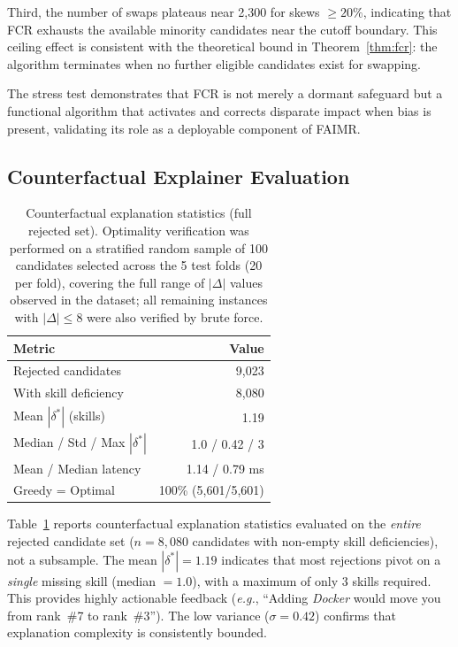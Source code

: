 \documentclass{svproc}
\begin{document}
Third, the number of swaps plateaus near 2,300 for skews $\geq 20\%$, indicating that FCR exhausts the available minority candidates near the cutoff boundary. This ceiling effect is consistent with the theoretical bound in Theorem~\ref{thm:fcr}: the algorithm terminates when no further eligible candidates exist for swapping.

The stress test demonstrates that FCR is not merely a dormant safeguard but a functional algorithm that activates and corrects disparate impact when bias is present, validating its role as a deployable component of FAIMR.

\subsection{Counterfactual Explainer Evaluation}

\begin{table}[t]
\centering
\caption{Counterfactual explanation statistics (full rejected set). Optimality verification was performed on a stratified random sample of 100 candidates selected across the 5 test folds (20 per fold), covering the full range of $|\Delta|$ values observed in the dataset; all remaining instances with $|\Delta| \leq 8$ were also verified by brute force.}
\label{tab:counterfactual}
{\small
\begin{tabular}{@{}lr@{}}
\toprule
Metric & Value \\
\midrule
Rejected candidates & 9,023 \\
With skill deficiency & 8,080 \\
Mean $|\delta^*|$ (skills) & 1.19 \\
Median / Std / Max $|\delta^*|$ & 1.0 / 0.42 / 3 \\
Mean / Median latency & 1.14 / 0.79 ms \\
Greedy = Optimal & 100\% (5,601/5,601) \\
\bottomrule
\end{tabular}}
\end{table}

Table~\ref{tab:counterfactual} reports counterfactual explanation statistics evaluated on the \textit{entire} rejected candidate set ($n = 8{,}080$ candidates with non-empty skill deficiencies), not a subsample. The mean $|\delta^*| = 1.19$ indicates that most rejections pivot on a \textit{single} missing skill (median $= 1.0$), with a maximum of only 3 skills required. This provides highly actionable feedback (\textit{e.g.}, ``Adding \textit{Docker} would move you from rank~\#7 to rank~\#3''). The low variance ($\sigma = 0.42$) confirms that explanation complexity is consistently bounded.
\end{document}
